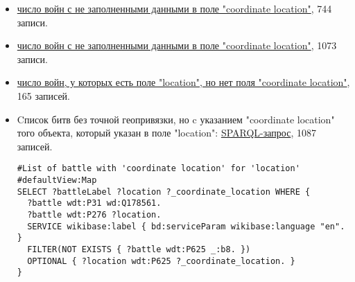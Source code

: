 \begin{itemize}
\item
\href{https://query.wikidata.org/#%23List%20of%20war%20with%20unfilled%20property%20%27location%27%20%20%0ASELECT%20%3Fwar%20%3FwarLabel%20%3Flocation%0AWHERE%0A%7B%0A%20%20%3Fwar%20wdt%3AP31%20wd%3AQ198.%20%23instance%20of%20war%0A%20%20FILTER%20NOT%20EXISTS%20%7B%20%3Fwar%20wdt%3AP625%20%5B%5D%20%7D%20%23if%20property%20location%20is%20unfilled%0A%20%20SERVICE%20wikibase%3Alabel%20%7B%20bd%3AserviceParam%20wikibase%3Alanguage%20%22en%22%7D%0A%7D}{число войн с не заполненными данными в поле "coordinate location"}, 744 записи.


\item{}
\href{https://query.wikidata.org/#%23List%20of%20battle%20with%20unfilled%20property%20%27location%27%20%0ASELECT%20%3FbattleLabel%20%3Flocation%0AWHERE%0A%7B%0A%20%20%3Fbattle%20wdt%3AP31%20wd%3AQ178561.%20%23instance%20of%20battle%0A%20%20%3Fbattle%20wdt%3AP276%20%3Flocation%20%23display%20location%0A%20%20FILTER%20NOT%20EXISTS%20%7B%20%3Fbattle%20wdt%3AP625%20%5B%5D%20%7D%20%23if%20property%20location%20is%20unfilled%0A%20%20SERVICE%20wikibase%3Alabel%20%7B%20bd%3AserviceParam%20wikibase%3Alanguage%20%22en%22%7D%0A%7D}{число войн с не заполненными данными в поле "coordinate location"}, 1073 записи.

\item{}
\href{https://query.wikidata.org/#%23List%20of%20war%20with%20unfilled%20property%20%27location%27%20%20%0ASELECT%20%3FwarLabel%20%3Flocation%0AWHERE%0A%7B%0A%20%20%3Fwar%20wdt%3AP31%20wd%3AQ198.%20%23instance%20of%20war%0A%20%20%3Fwar%20wdt%3AP276%20%3Flocation%20%23display%20location%0A%20%20FILTER%20NOT%20EXISTS%20%7B%20%3Fwar%20wdt%3AP625%20%5B%5D%20%7D%20%23if%20property%20location%20is%20unfilled%0A%20%20SERVICE%20wikibase%3Alabel%20%7B%20bd%3AserviceParam%20wikibase%3Alanguage%20%22en%22%7D%0A%7D}{число войн, у которых есть поле "location", но нет поля "coordinate location"}, 165 записей.

\item{Cписок битв без точной геопривязки, но c указанием "coordinate location" того объекта, который указан в поле "location":} \href{https://query.wikidata.org/#%23List%20of%20battle%20with%20%27coordinate%20location%27%20%0A%23defaultView%3AMap%0ASELECT%20%3FbattleLabel%20%3Flocation%20%3F_coordinate_location%20WHERE%20%7B%0A%20%20%3Fbattle%20wdt%3AP31%20wd%3AQ178561.%0A%20%20%3Fbattle%20wdt%3AP276%20%3Flocation.%0A%20%20SERVICE%20wikibase%3Alabel%20%7B%20bd%3AserviceParam%20wikibase%3Alanguage%20%22en%22.%20%7D%0A%20%20FILTER%28NOT%20EXISTS%20%7B%20%3Fbattle%20wdt%3AP625%20_%3Ab8.%20%7D%29%0A%20%20OPTIONAL%20%7B%20%3Flocation%20wdt%3AP625%20%3F_coordinate_location.%20%7D%0A%7D}{ SPARQL-запрос}, 1087 записей.
\begin{lstlisting}[language=SPARQL]
#List of battle with 'coordinate location' for 'location'
#defaultView:Map
SELECT ?battleLabel ?location ?_coordinate_location WHERE {
  ?battle wdt:P31 wd:Q178561.
  ?battle wdt:P276 ?location.
  SERVICE wikibase:label { bd:serviceParam wikibase:language "en". }
  FILTER(NOT EXISTS { ?battle wdt:P625 _:b8. })
  OPTIONAL { ?location wdt:P625 ?_coordinate_location. }
}
\end{lstlisting}


\end{itemize}
